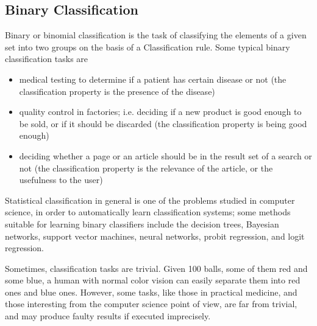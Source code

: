 \subsection{Binary Classification}

Binary or binomial classification is the task of classifying the elements of a given set into two groups on the basis of a Classification rule. Some typical binary classification tasks are

\begin{itemize}
\item medical testing to determine if a patient has certain disease or not (the classification property is the presence of the disease)
\item quality control in factories; i.e. deciding if a new product is good enough to be sold, or if it should be discarded (the classification property is being good enough)
\item deciding whether a page or an article should be in the result set of a search or not (the classification property is the relevance of the article, or the usefulness to the user)
\end{itemize}
Statistical classification in general is one of the problems studied in computer science, in order to automatically learn classification systems; some methods suitable for learning binary classifiers include the decision trees, Bayesian networks, support vector machines, neural networks, probit regression, and logit regression.

Sometimes, classification tasks are trivial. Given 100 balls, some of them red and some blue, a human with normal color vision can easily separate them into red ones and blue ones. However, some tasks, like those in practical medicine, and those interesting from the computer science point of view, are far from trivial, and may produce faulty results if executed imprecisely.


